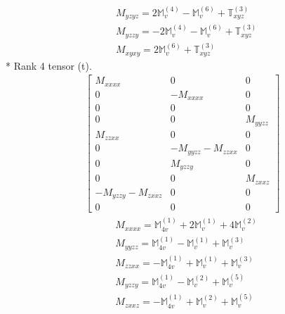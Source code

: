 \documentclass[fleqn,8pt,landscape]{jsarticle}
\begin{document}
\begin{align*}
& M_{yzyz} = 2 \mathbb{M}_{v}^{(4)} - \mathbb{M}_{v}^{(6)} + \mathbb{T}_{xyz}^{(3)} \\
& M_{yzzy} = - 2 \mathbb{M}_{v}^{(4)} - \mathbb{M}_{v}^{(6)} + \mathbb{T}_{xyz}^{(3)} \\
& M_{xyxy} = 2 \mathbb{M}_{v}^{(6)} + \mathbb{T}_{xyz}^{(3)}
\end{align*}
* Rank 4 tensor (t).
\begin{align*}
\begin{bmatrix} M_{xxxx} & 0 & 0 \\ 0 & - M_{xxxx} & 0 \\ 0 & 0 & 0 \\ 0 & 0 & M_{yyzz} \\ M_{zzxx} & 0 & 0 \\ 0 & - M_{yyzz} - M_{zzxx} & 0 \\ 0 & M_{yzzy} & 0 \\ 0 & 0 & M_{zxxz} \\ - M_{yzzy} - M_{zxxz} & 0 & 0 \\ 0 & 0 & 0 \end{bmatrix}
\end{align*}
\begin{align*}
& M_{xxxx} = \mathbb{M}_{4v}^{(1)} + 2 \mathbb{M}_{v}^{(1)} + 4 \mathbb{M}_{v}^{(2)} \\
& M_{yyzz} = \mathbb{M}_{4v}^{(1)} - \mathbb{M}_{v}^{(1)} + \mathbb{M}_{v}^{(3)} \\
& M_{zzxx} = - \mathbb{M}_{4v}^{(1)} + \mathbb{M}_{v}^{(1)} + \mathbb{M}_{v}^{(3)} \\
& M_{yzzy} = \mathbb{M}_{4v}^{(1)} - \mathbb{M}_{v}^{(2)} + \mathbb{M}_{v}^{(5)} \\
& M_{zxxz} = - \mathbb{M}_{4v}^{(1)} + \mathbb{M}_{v}^{(2)} + \mathbb{M}_{v}^{(5)}
\end{align*}
\end{document}
